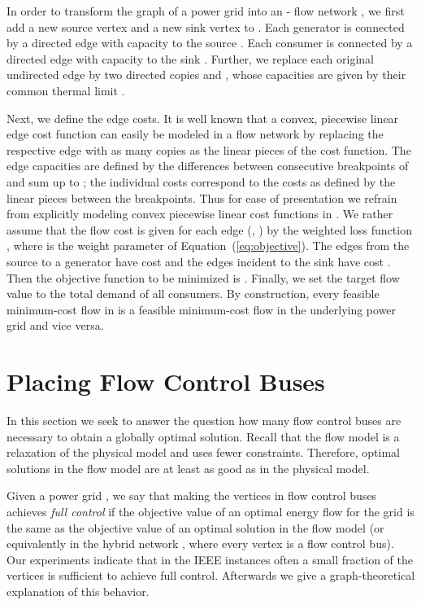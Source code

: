 \documentclass{article}[11pt,a4paper]
\begin{document}
In order to transform the graph  of a power grid into an - flow network , we first add a new source vertex  and a new sink vertex  to . 
Each generator  is connected by a directed edge  with capacity  to the source . 
Each consumer  is connected by a directed edge  with capacity  to the sink . 
Further, we replace each original undirected edge  by two directed copies  and , whose capacities  are given by their common thermal limit . 

Next, we define the edge costs. 
It is well known that a convex, piecewise linear edge cost function  can easily be modeled in a flow network by replacing the respective edge  with as many copies as the linear pieces of the cost function. 
The edge capacities are defined by the differences between consecutive breakpoints of  and sum up to ; the individual costs correspond to the costs as defined by the linear pieces between the breakpoints. 
Thus for ease of presentation we refrain from explicitly modeling convex piecewise linear cost functions in . 
We rather assume that the flow cost  is given for each edge  (, ) by the weighted loss function , where  is the weight parameter of Equation~(\ref{eq:objective}). 
The edges  from the source  to a generator  have cost  and the edges incident to the sink  have cost . 
Then the objective function to be minimized is .
Finally, we set the target flow value  to the total demand  of all consumers. 
By construction, every feasible minimum-cost flow in  is a feasible minimum-cost flow in the underlying power grid  and vice versa.
\section{Placing Flow Control Buses} 
\label{sec:hybridmodel}
In this section we seek to answer the question how many flow control buses
are necessary to obtain a globally optimal solution.  
Recall that the flow model is a relaxation of the physical model and uses fewer 
constraints. Therefore, optimal solutions in the flow model are at least as good as
in the physical model.

Given a power grid , we say that making the vertices in  flow control buses achieves \emph{full control} if the objective value of an
optimal energy flow for the grid  is the same as the objective
value of an optimal solution in the flow model (or equivalently in the
hybrid network , where every vertex is a flow control bus).  Our experiments indicate that in the IEEE instances often a
small fraction of the vertices is sufficient to achieve full control.
Afterwards we give a graph-theoretical explanation of this behavior.
\end{document}
